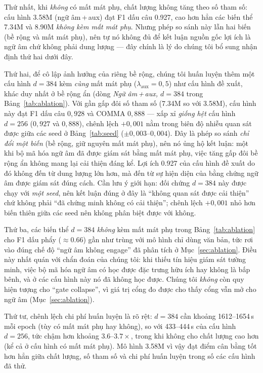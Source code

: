 \documentclass[conference,onecolumn]{IEEEtran}
\begin{document}
Thứ nhất, khi \emph{không} có mất mát phụ, chất lượng không tăng theo số tham
số: cấu hình 3.58M (ngữ âm\,+\,aux) đạt F1 dấu câu 0.927, cao hơn hẳn các biến
thể 7.34M và 8.90M \emph{không kèm mất mát phụ}. Nhưng phép so sánh này lẫn hai
biến (bề rộng và mất mát phụ), nên tự nó không đủ để kết luận nguồn gốc lợi ích
là ngữ âm chứ không phải dung lượng --- đây chính là lý do chúng tôi bổ sung
nhận định thứ hai dưới đây.

Thứ hai, để cô lập ảnh hưởng của riêng bề rộng, chúng tôi huấn luyện thêm một
cấu hình $d{=}384$ kèm \emph{cùng} mất mát phụ ($\lambda_{\mathrm{aux}}=0{,}5$)
như cấu hình đề xuất, khác duy nhất ở bề rộng ẩn (dòng \emph{Ngữ
âm\,+\,aux, $d{=}384$} trong Bảng~\ref{tab:ablation}). Với gần gấp đôi số tham
số (7.34M so với 3.58M), cấu hình này đạt F1 dấu câu $0{,}928$ và COMMA
$0{,}888$ --- xấp xỉ \emph{giống hệt} cấu hình $d{=}256$ ($0{,}927$ và
$0{,}888$), chênh lệch $+0{,}001$ nằm trong biên độ nhiễu quan sát được giữa
các seed ở Bảng~\ref{tab:seed} ($\pm0{,}003$--$0{,}004$). Đây là phép so sánh
\emph{chỉ đổi một biến} (bề rộng, giữ nguyên mất mát phụ), nên nó ủng hộ kết
luận: một khi bộ mã hóa ngữ âm đã được giám sát bằng mất mát phụ, việc tăng gấp
đôi bề rộng ẩn không mang lại cải thiện đáng kể. Lợi ích 0.927 của cấu hình đề
xuất do đó không đến từ dung lượng lớn hơn, mà đến từ sự hiện diện của bằng
chứng ngữ âm được giám sát đúng cách. Cần lưu ý giới hạn: đối chứng $d{=}384$
này được chạy với \emph{một seed}, nên kết luận đúng ở đây là ``không quan sát
được cải thiện'' chứ không phải ``đã chứng minh không có cải thiện''; chênh lệch
$+0{,}001$ nhỏ hơn biến thiên giữa các seed nên không phân biệt được với không.

Thứ ba, các biến thể $d{=}384$ \emph{không} kèm mất mát phụ trong
Bảng~\ref{tab:ablation} cho F1 dấu phẩy ($\approx\!0.66$) gần như trùng với mô
hình chỉ dùng văn bản, tức rơi vào đúng chế độ ``ngữ âm không engage'' đã phân
tích ở Mục~\ref{sec:ablation}. Điều này nhất quán với chẩn đoán của chúng tôi:
khi thiếu tín hiệu giám sát tường minh, việc bộ mã hóa ngữ âm có học được đặc
trưng hữu ích hay không là bấp bênh, và ở các cấu hình này nó đã không học
được. Chúng tôi \emph{không} còn quy hiện tượng cho ``gate collapse'', vì giá
trị cổng đo được cho thấy cổng vẫn mở cho ngữ âm (Mục~\ref{sec:ablation}).

Thứ tư, chênh lệch chi phí huấn luyện là rõ rệt: $d{=}384$ cần khoảng
1612--1654\,s mỗi epoch (tùy có mất mát phụ hay không), so với 433--444\,s của
cấu hình $d{=}256$, tức chậm hơn khoảng $3.6$--$3.7\times$, trong khi không cho
chất lượng cao hơn (kể cả ở cấu hình có mất mát phụ). Mô hình 3.58M vì vậy đạt
điểm cân bằng tốt hơn hẳn giữa chất lượng, số tham số và chi phí huấn luyện
trong số các cấu hình đã thử.
\end{document}
